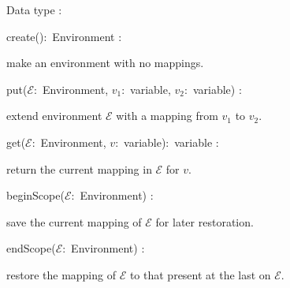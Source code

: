 Data type :
\begin{tightdesc}
\item[create():~Environment]
:\par   make an environment with no mappings.
\item[put($\mathcal{E}$:~Environment, $v_1$:~variable, $v_2$:~variable)]
:\par   extend environment $\mathcal{E}$ with a mapping from $v_1$ to $v_2$.
\item[get($\mathcal{E}$:~Environment, $v$:~variable):~variable]
:\par   return the current mapping in $\mathcal{E}$ for $v$.
\item[beginScope($\mathcal{E}$:~Environment)]
:\par   save the current mapping of $\mathcal{E}$ for later restoration.
\item[endScope($\mathcal{E}$:~Environment)]
:\par   restore the mapping of $\mathcal{E}$ to that present at the
        last  on $\mathcal{E}$.
\end{tightdesc}
